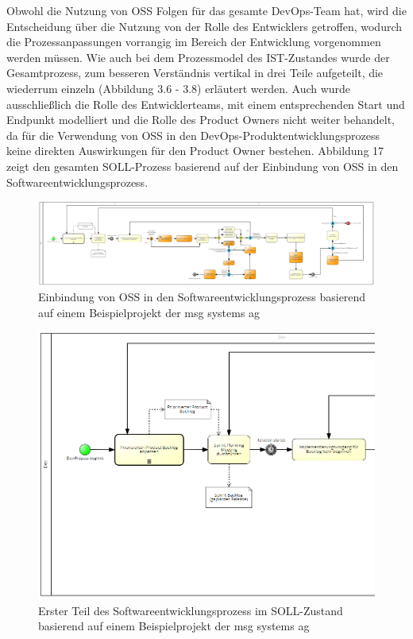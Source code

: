 Obwohl die Nutzung von OSS Folgen für das gesamte DevOps-Team hat, wird die Entscheidung über die Nutzung von der Rolle des Entwicklers getroffen, wodurch die Prozessanpassungen vorrangig im Bereich der Entwicklung vorgenommen werden müssen. Wie auch bei dem Prozessmodel des IST-Zustandes wurde der Gesamtprozess, zum besseren Verständnis vertikal in drei Teile aufgeteilt, die wiederrum einzeln (Abbildung 3.6 - 3.8) erläutert werden. Auch wurde ausschließlich die Rolle des Entwicklerteams, mit einem entsprechenden Start und Endpunkt modelliert und die Rolle des Product Owners nicht weiter behandelt, da für die Verwendung von OSS in den DevOps-Produktentwicklungsprozess keine direkten Auswirkungen für den Product Owner bestehen. Abbildung 17 zeigt den gesamten SOLL-Prozess basierend auf der Einbindung von OSS in den Softwareentwicklungsprozess.

\begin{figure}[p]
    \centering
    \includegraphics[angle=90, scale=0.7]{Bilder/SOLL-Prozess.png}
    \caption{Einbindung von OSS in den Softwareentwicklungsprozess basierend auf einem Beispielprojekt der msg systems ag}
\end{figure}

\newpage
\begin{figure}[h]
    \centering
    \includegraphics[scale=0.3]{Bilder/SOLL-Prozess_first Part.png}
    \caption{Erster Teil des Softwareentwicklungsprozess im SOLL-Zustand basierend auf einem Beispielprojekt der msg systems ag}
\end{figure}

